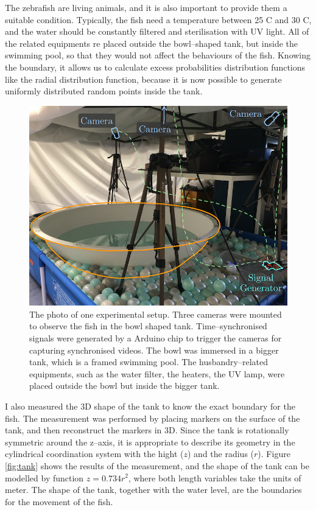 \documentclass[11pt,twoside]{report}
\begin{document}
The zebrafish are living animals, and it is also important to provide them a suitable condition. Typically, the fish need a temperature between 25 \degree C and 30 \degree C, and the water should be constantly filtered and sterilisation with UV light. All of the related equipments re placed outside the bowl--shaped tank, but inside the swimming pool, so that they would not affect the behaviours of the fish. Knowing the boundary, it allows us to calculate excess probabilities distribution functions like the radial distribution function, because it is now possible to generate uniformly distributed random points inside the tank. 


\begin{figure}
  \includegraphics[width=0.8\linewidth,outer]{lab.jpg}
  \caption{The photo of one experimental setup. Three cameras were mounted to observe the fish in the bowl shaped tank. Time--synchronised signals were generated by a Arduino chip to trigger the cameras for capturing synchronised videos. The bowl was immersed in a bigger tank, which is a framed swimming pool. The husbandry--related equipments, such as the water filter, the heaters, the UV lamp, were placed outside the bowl but inside the bigger tank.}
  \label{fig:lab}
\end{figure}


I also measured the 3D shape of the tank to know the exact boundary for the fish. The measurement was performed by placing markers on the surface of the tank, and then reconstruct the markers in 3D. Since the tank is rotationally symmetric around the z--axis, it is appropriate to describe its geometry in the cylindrical coordination system with the hight ($z$) and the radius ($r$). Figure \ref{fig:tank} shows the results of the measurement, and the shape of the tank can be modelled by function $z=0.734 r^2$, where both length variables take the units of meter. The shape of the tank, together with the water level, are the boundaries for the movement of the fish.
\end{document}
